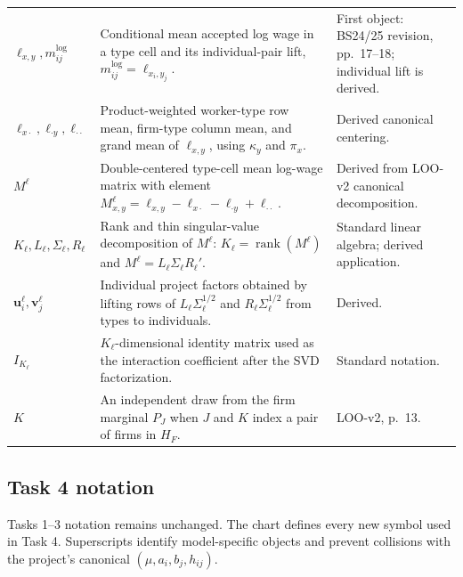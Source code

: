 \documentclass[11pt]{article}
\begin{document}
\begin{longtable}{p{}p{}p{}}
\(\ell_{x,y},m^{\log}_{ij}\) & Conditional mean accepted log wage in a type
cell and its individual-pair lift,
\(m^{\log}_{ij}=\ell_{x_i,y_j}\). & First object: BS24/25 revision,
pp.\ 17--18; individual lift is derived. \\
\(\ell_{x\cdot},\ell_{\cdot y},\ell_{\cdot\cdot}\) & Product-weighted
worker-type row mean, firm-type column mean, and grand mean of
\(\ell_{x,y}\), using \(\kappa_y\) and \(\pi_x\). & Derived canonical
centering. \\
\(M^\ell\) & Double-centered type-cell mean log-wage matrix with element
\(M^\ell_{x,y}=\ell_{x,y}-\ell_{x\cdot}-\ell_{\cdot y}
+\ell_{\cdot\cdot}\). & Derived from LOO-v2 canonical decomposition. \\
\(K_\ell,L_\ell,\Sigma_\ell,R_\ell\) & Rank and thin singular-value
decomposition of \(M^\ell\):
\(K_\ell=\operatorname{rank}(M^\ell)\) and
\(M^\ell=L_\ell\Sigma_\ell R_\ell'\). & Standard linear algebra; derived
application. \\
\(\mathbf u_i^\ell,\mathbf v_j^\ell\) & Individual project factors obtained
by lifting rows of \(L_\ell\Sigma_\ell^{1/2}\) and
\(R_\ell\Sigma_\ell^{1/2}\) from types to individuals. & Derived. \\
\(I_{K_\ell}\) & \(K_\ell\)-dimensional identity matrix used as the
interaction coefficient after the SVD factorization. & Standard notation. \\
\(K\) & An independent draw from the firm marginal \(P_J\) when \(J\) and
\(K\) index a pair of firms in \(H_F\). & LOO-v2, p.\ 13. \\
\end{longtable}
\subsection{Task 4 notation}

Tasks 1--3 notation remains unchanged.  The chart defines every new symbol
used in Task 4.  Superscripts identify model-specific objects and prevent
collisions with the project's canonical \((\mu,a_i,b_j,h_{ij})\).
\end{document}
